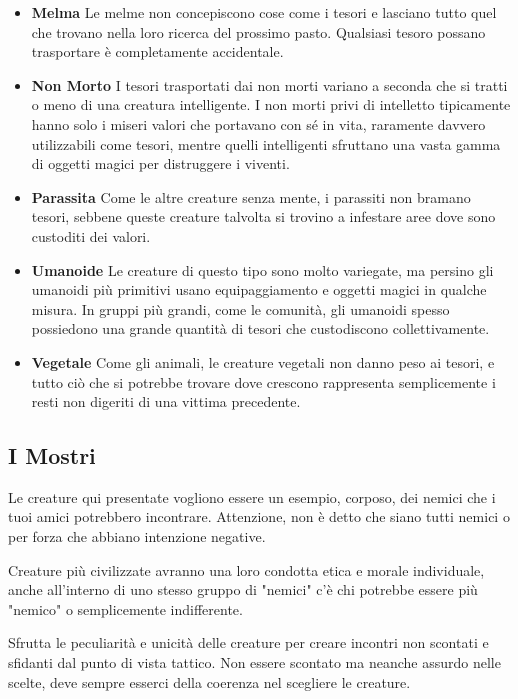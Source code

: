 \begin{multicols}{2}
\begin{itemize}
\item \textbf{Melma}
Le melme non concepiscono cose come i tesori e lasciano tutto quel che trovano nella loro ricerca del prossimo pasto. Qualsiasi tesoro possano trasportare è completamente accidentale.

\item \textbf{Non Morto}
I tesori trasportati dai non morti variano a seconda che si tratti o meno di una creatura intelligente. I non morti privi di intelletto tipicamente hanno solo i miseri valori che portavano con sé in vita, raramente davvero utilizzabili come tesori, mentre quelli intelligenti sfruttano una vasta gamma di oggetti magici per distruggere i viventi.

\item \textbf{Parassita}
Come le altre creature senza mente, i parassiti non bramano tesori, sebbene queste creature talvolta si trovino a infestare aree dove sono custoditi dei valori.

\item \textbf{Umanoide}
Le creature di questo tipo sono molto variegate, ma persino gli umanoidi più primitivi usano equipaggiamento e oggetti magici in qualche misura. In gruppi più grandi, come le comunità, gli umanoidi spesso possiedono una grande quantità di tesori che custodiscono collettivamente.

\item \textbf{Vegetale}
Come gli animali, le creature vegetali non danno peso ai tesori, e tutto ciò che si potrebbe trovare dove crescono rappresenta semplicemente i resti non digeriti di una vittima precedente.

\end{itemize}

\end{multicols}

\pagebreak

\subsection{I Mostri}


\begin{changemargin}{0.3cm}{0.3cm}\begin{narratore}
Le creature qui presentate vogliono essere un esempio, corposo, dei nemici che i tuoi amici potrebbero incontrare. Attenzione, non è detto che siano tutti nemici o per forza che abbiano intenzione negative.

Creature più civilizzate avranno una loro condotta etica e morale individuale, anche all'interno di uno stesso gruppo di "nemici" c'è chi potrebbe essere più "nemico" o semplicemente indifferente.

Sfrutta le peculiarità e unicità delle creature per creare incontri non scontati e sfidanti dal punto di vista tattico. Non essere scontato ma neanche assurdo nelle scelte, deve sempre esserci della coerenza nel scegliere le creature.
\end{narratore}\end{changemargin}


